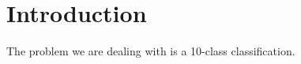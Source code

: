 \documentclass[../main.tex]{subfiles}
\begin{document}
\section{Introduction}\label{sec:introduction}
The problem we are dealing with is a 10-class classification. 
\end{document}
